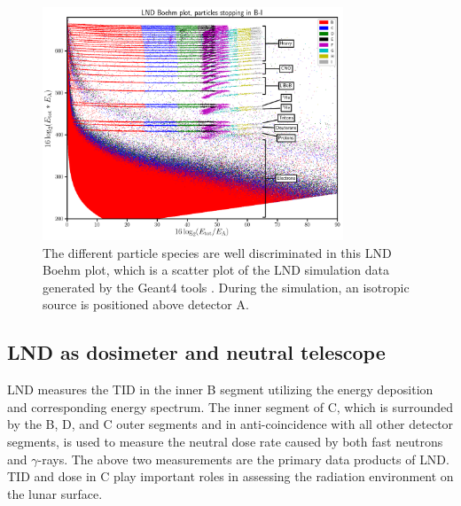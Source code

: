 \begin{figure}
    \centering
    \includegraphics[width=0.8\textwidth]{images/LND_Boehm_plot_isotropic_on_top_of_A_annotated.png}
    \caption[LND Boehm plot of stopping particles based on the simulated data]{The different particle species are well discriminated in this LND Boehm plot, which is a scatter plot of the \ac{LND} simulation data generated by the \ac{Geant4} tools \citep{Agostinelli-2003}. During the simulation, an isotropic source is positioned above detector A.}
    \label{Fig:LND-Boehm-plot}
\end{figure}


\subsection*{LND as dosimeter and neutral telescope}

\ac{LND} measures the \ac{TID} in the inner B segment utilizing the energy deposition and corresponding energy spectrum. The inner segment of C, which is surrounded by the B, D, and C outer segments and in anti-coincidence with all other detector segments, is used to measure the neutral dose rate caused by both fast neutrons and $\gamma$-rays. The above two measurements are the primary data products of \ac{LND}. \ac{TID} and dose in C play important roles in assessing the radiation environment on the lunar surface. 


